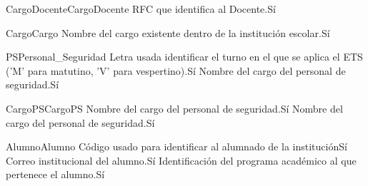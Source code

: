 \begin{cdtEntidad}{CargoDocente}{CargoDocente}
	{RFC que identifica al Docente.}{Sí}
\end{cdtEntidad}
\begin{cdtEntidad}{Cargo}{Cargo}
	{Nombre del cargo existente dentro de la institución escolar.}{Sí}
\end{cdtEntidad}
\begin{cdtEntidad}{PS}{Personal\_Seguridad}
	{Letra usada identificar el turno en el que se aplica el ETS ('M' para matutino, 'V' para vespertino).}{Sí}
	{Nombre del cargo del personal de seguridad.}{Sí}
	\cdtEntityRelSection
\end{cdtEntidad}
\begin{cdtEntidad}{CargoPS}{CargoPS}
	{Nombre del cargo del personal de seguridad.}{Sí}
	{Nombre del cargo del personal de seguridad.}{Sí}
\end{cdtEntidad}
\begin{cdtEntidad}{Alumno}{Alumno}
	{Código usado para identificar al alumnado de la institución}{Sí}
	{Correo institucional del alumno.}{Sí}
	{Identificación del programa académico al que pertenece el alumno.}{Sí}
\end{cdtEntidad}
